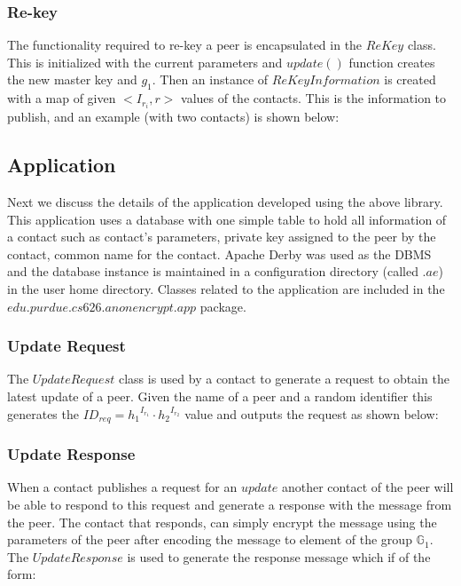 \subsubsection{Re-key}
The functionality required to re-key a peer is encapsulated in the $ReKey$ class. This is initialized with the current parameters and $update()$ function creates the new master key and $g_1$. Then an instance of $ReKeyInformation$ is created with a map of given $<I_{r_i}, r>$ values of the contacts. This is the information to publish, and an example (with two contacts) is shown below:



\subsection{Application}

Next we discuss the details of the application developed using the above library. This application uses a database with one simple table to hold all information of a contact such as contact's parameters, private key assigned to the peer by the contact, common name for the contact. Apache Derby \cite{derby} was used as the DBMS and the database instance is maintained in a configuration directory (called $.ae$) in the user home directory. Classes related to the application are included in the $edu.purdue.cs626.anonencrypt.app$ package.\\

\subsubsection{Update Request}
The $UpdateRequest$ class is used by a contact to generate a request to obtain the latest update of a peer. Given the name of a peer and a random identifier this generates the $ID_{req} = {h_1}^{I_{r_1}} \cdot {h_2}^{I_{r_2}}$ value and outputs the request as shown below:



\subsubsection{Update Response}
When a contact publishes a request for an $update$ another contact of the peer will be able to respond to this request and generate a response with the message from the peer. The contact that responds, can simply encrypt the message using the parameters of the peer after encoding the message to element of the group $\mathbb{G}_1$. The $UpdateResponse$ is used to generate the response message which if of the form:

